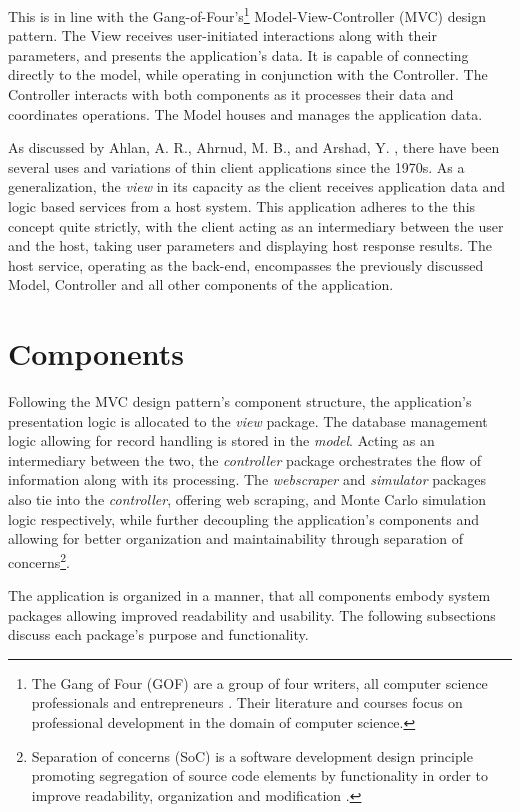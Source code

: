 \documentclass{thesis-ekf}
\theoremstyle{definition}
\theoremstyle{remark}
\begin{document}
This is in line with the Gang-of-Four's\footnote{The Gang of Four (GOF) are a group of four writers, all computer science professionals and entrepreneurs \cite{GOF2}. Their literature and courses focus on professional development in the domain of computer science.} Model-View-Controller (MVC) \cite[p.~529]{GOF} design pattern. The View receives user-initiated interactions along with their parameters, and presents the application's data. It is capable of connecting directly to the model, while operating in conjunction with the Controller. The Controller interacts with both components as it processes their data and coordinates operations. The Model houses and manages the application data.

As discussed by Ahlan, A. R., Ahrnud, M. B., and Arshad, Y. \cite{Kulliyyah}, there have been several uses and variations of thin client applications since the 1970s. As a generalization, the \emph{view} in its capacity as the client receives application data and logic based services from a host system. This application adheres to the this concept quite strictly, with the client acting as an intermediary between the user and the host, taking user parameters and displaying host response results. The host service, operating as the back-end, encompasses the previously discussed Model, Controller and all other components of the application.

\section{Components}
Following the MVC design pattern's component structure, the application's presentation logic is allocated to the \emph{view} package. The database management logic allowing for record handling is stored in the \emph{model}. Acting as an intermediary between the two, the \emph{controller} package orchestrates the flow of information along with its processing. The \emph{webscraper} and \emph{simulator} packages also tie into the \emph{controller}, offering web scraping, and Monte Carlo simulation logic respectively, while further decoupling the application's components and allowing for better organization and maintainability through separation of concerns\footnote{Separation of concerns (SoC) is a software development design principle promoting segregation of source code elements by functionality in order to improve readability, organization and modification \cite{Reade}.}.

The application is organized in a manner, that all components embody system packages allowing improved readability and usability. The following subsections discuss each package's purpose and functionality.
\end{document}
